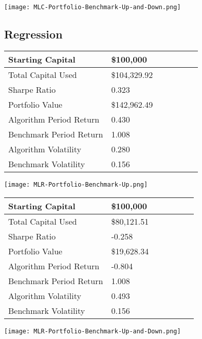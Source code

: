 \begin{center}  
    \texttt{[image: MLC-Portfolio-Benchmark-Up-and-Down.png]}
    \label{fig:nonfloat}
\end{center}

\subsection{Regression}

\begin{center}
    \begin{tabular}{ | l | l | l | | l | l | l | p{5cm} |}
    \hline
    Starting Capital & \$100,000 \\ \hline
    Total Capital Used & \$104,329.92 \\ \hline
    Sharpe Ratio & 0.323 \\ \hline
    Portfolio Value & \$142,962.49 \\ \hline
    Algorithm Period Return & 0.430 \\ \hline
    Benchmark Period Return & 1.008 \\ \hline
    Algorithm Volatility & 0.280 \\ \hline
    Benchmark Volatility & 0.156 \\
    \hline
    \end{tabular}
    \label{table:nonfloat}
\end{center}

\begin{center}  
    \texttt{[image: MLR-Portfolio-Benchmark-Up.png]}
    \label{fig:nonfloat}
\end{center}

\begin{center}
    \begin{tabular}{ | l | l | l | | l | l | l | p{5cm} |}
    \hline
    Starting Capital & \$100,000 \\ \hline
    Total Capital Used & \$80,121.51 \\ \hline
    Sharpe Ratio & -0.258 \\ \hline
    Portfolio Value & \$19,628.34 \\ \hline
    Algorithm Period Return & -0.804 \\ \hline
    Benchmark Period Return & 1.008 \\ \hline
    Algorithm Volatility & 0.493 \\ \hline
    Benchmark Volatility & 0.156 \\
    \hline
    \end{tabular}
    \label{table:nonfloat}
\end{center}

\begin{center}  
    \texttt{[image: MLR-Portfolio-Benchmark-Up-and-Down.png]}
    \label{fig:nonfloat}
\end{center}